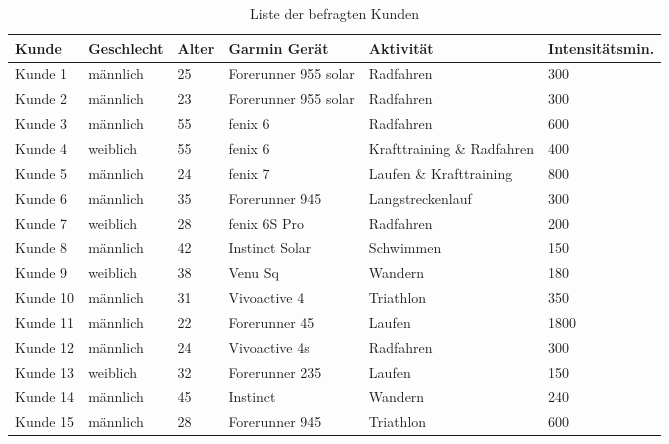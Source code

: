 \begin{table}[H]
\caption{Liste der befragten Kunden} \label{tab:kunden}
\begin{center}
\begin{tabular}{ l l l l l l }
\toprule
Kunde       & Geschlecht    & Alter     & Garmin Gerät      & Aktivität     & Intensitätsmin. \\ 
\midrule
Kunde 1     & männlich      & 25        & Forerunner 955 solar          & Radfahren        & 300 \\
Kunde 2     & männlich      & 23        & Forerunner 955 solar          & Radfahren        & 300 \\
Kunde 3     & männlich      & 55        & fenix 6           & Radfahren        & 600 \\
Kunde 4     & weiblich      & 55        & fenix 6           & Krafttraining \& Radfahren        & 400 \\
Kunde 5     & männlich      & 24        & fenix 7           & Laufen \& Krafttraining  & 800 \\

Kunde 6     & männlich      & 35        & Forerunner 945    & Langstreckenlauf      & 300 \\
Kunde 7     & weiblich      & 28        & fenix 6S Pro      & Radfahren             & 200 \\
Kunde 8     & männlich      & 42        & Instinct Solar    & Schwimmen             & 150 \\
Kunde 9     & weiblich      & 38        & Venu Sq           & Wandern               & 180 \\
Kunde 10    & männlich      & 31        & Vivoactive 4      & Triathlon             & 350 \\

Kunde 11    & männlich      & 22        & Forerunner 45     & Laufen                & 1800 \\
Kunde 12    & männlich      & 24        & Vivoactive 4s     & Radfahren             & 300 \\
Kunde 13    & weiblich      & 32        & Forerunner 235    & Laufen                & 150 \\
Kunde 14    & männlich      & 45        & Instinct          & Wandern               & 240 \\
Kunde 15    & männlich      & 28        & Forerunner 945    & Triathlon             & 600 \\
\bottomrule
\end{tabular} 
\end{center}
\end{table} 